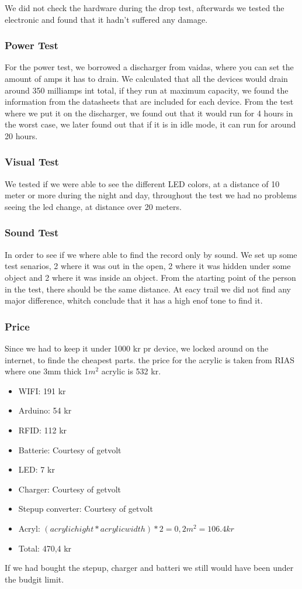 We did not check the hardware during the drop test, afterwards we tested the electronic and found that it hadn't suffered any damage.

\subsubsection{Power Test}
For the power test, we borrowed a discharger from vaidas, where you can set the amount of amps it has to drain.
We calculated that all the devices would drain around 350 milliamps int total, if they run at maximum capacity, we found the information from the datasheets that are included for each device.
From the test where we put it on the discharger, we found out that it would run for 4 hours in the worst case, we later found out that if it is in idle mode, it can run for around 20 hours.

\subsubsection{Visual Test}
We tested if we were able to see the different LED colors, at a distance of 10 meter or more during the night and day, throughout the test we had no problems seeing the led change, at distance over 20 meters.

\subsubsection{Sound Test}
In order to see if we where able to find the record only by sound.
We set up some test senarios, 2 where it was out in the open, 2 where it was hidden under some object and 2 where it was inside an object. From the atarting point of the person in the test, there should be the same distance.
At eacy trail we did not find any major difference, whitch conclude that it has a high enof tone to find it.

\subsubsection{Price}
Since we had to keep it under 1000 kr pr device, we locked around on the internet, to finde the cheapest parts.
the price for the acrylic is taken from RIAS \cite{RIAS} where one 3mm thick $1 m^2$ acrylic is 532 kr.
\begin{itemize} \itemsep0em
	 \item WIFI: 191 kr \cite{Adafruit}
	 \item Arduino: 54 kr \cite{Sparkfun}
	 \item RFID: 112 kr \cite{Let-Eletronik}
	 \item Batterie: Courtesy of getvolt  \cite{Getvolt}
	 \item LED: 7 kr \cite{Adafruit}
	 \item Charger: Courtesy of getvolt \cite{Getvolt}
	 \item Stepup converter: Courtesy of getvolt  \cite{Getvolt}
	  \item Acryl: $(acrylic hight * acrylic width)*2 = 0,2 m^2 = 106.4 kr $ \cite{RIAS}
	 \item Total: 470,4 kr
\end{itemize}
If we had bought the stepup, charger and batteri we still would have been under the budgit limit.
